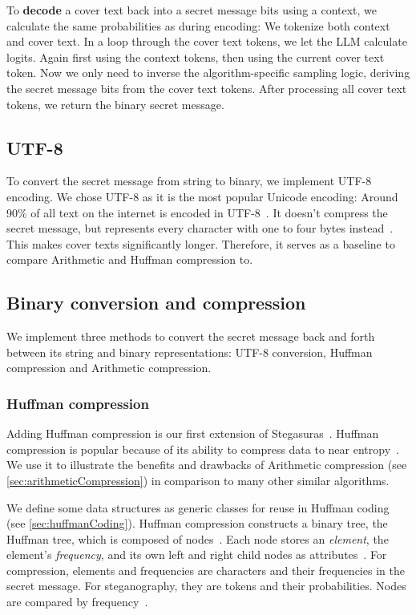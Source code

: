 To \textbf{decode} a cover text back into a secret message bits using a context, we calculate the same probabilities as during encoding: We tokenize both context and cover text. In a loop through the cover text tokens, we let the \gls{LLM} calculate logits. Again first using the context tokens, then using the current cover text token. Now we only need to inverse the algorithm-specific sampling logic, deriving the secret message bits from the cover text tokens. After processing all cover text tokens, we return the binary secret message.

\subsection{UTF-8}
\label{sec:utf8}
To convert the secret message from string to binary, we implement UTF-8 encoding. We chose UTF-8 as it is the most popular Unicode encoding: Around 90\% of all text on the internet is encoded in UTF-8~\cite{gleaveMakingCompressionAlgorithms2017}. It doesn't compress the secret message, but represents every character with one to four bytes instead~\cite{gleaveMakingCompressionAlgorithms2017}. This makes cover texts significantly longer. Therefore, it serves as a baseline to compare Arithmetic and Huffman compression to.

\subsection{Binary conversion and compression}
\label{sec:binaryConversionAndCompression}
We implement three methods to convert the secret message back and forth between its string and binary representations: UTF-8 conversion, Huffman compression and Arithmetic compression.

\subsubsection{Huffman compression}
\label{sec:huffmanCompression}
Adding Huffman compression is our first extension of Stegasuras~\cite{zieglerNeuralLinguisticSteganography2019}. Huffman compression is popular because of its ability to compress data to near entropy~\cite{huffmanMethodConstructionMinimumRedundancy1952}. We use it to illustrate the benefits and drawbacks of Arithmetic compression (see \cref{sec:arithmeticCompression}) in comparison to many other similar algorithms.

We define some data structures as generic classes for reuse in Huffman coding (see \cref{sec:huffmanCoding}). Huffman compression constructs a binary tree, the Huffman tree, which is composed of nodes~\cite{huffmanMethodConstructionMinimumRedundancy1952}. Each node stores an \textit{element}, the element's \textit{frequency}, and its own left and right child nodes as attributes~\cite{huffmanMethodConstructionMinimumRedundancy1952}. For compression, elements and frequencies are characters and their frequencies in the secret message. For steganography, they are tokens and their probabilities. Nodes are compared by frequency~\cite{huffmanMethodConstructionMinimumRedundancy1952}.

